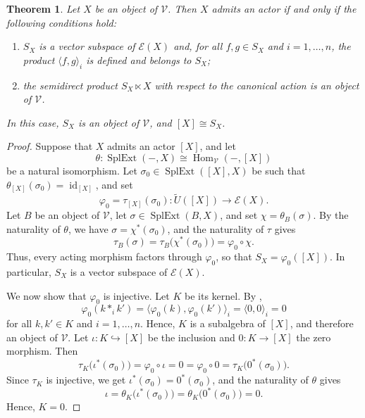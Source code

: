 \documentclass[reqno,a4paper]{amsart}
\theoremstyle{plain}
\newtheorem{theorem}[subsection]{Theorem}
\theoremstyle{definition}
\theoremstyle{remark}
\numberwithin{equation}{section}
\newcommand{\E}{\mathcal{E}}
\newcommand{\V}{\mathcal{V}}
\DeclareMathOperator{\Hom}{Hom}
\DeclareMathOperator{\SplExt}{SplExt}
\DeclareMathOperator{\id}{id}
\begin{document}
\begin{theorem}\label{ThmActorSX}
Let $X$ be an object of $\V$. Then $X$ admits an actor if and only if the following conditions hold:
\begin{enumerate}
\item $S_X$ is a vector subspace of $\E(X)$ and, for all $f,g\in S_X$ and $i=1,\ldots,n$, the product $\langle f,g\rangle_i$ is defined and belongs to $S_X$;
\item the semidirect product $S_X\ltimes X$ with respect to the canonical action is an object of $\V$.
\end{enumerate}
In this case, $S_X$ is an object of $\V$, and $[X]\cong S_X$.
\end{theorem}

\begin{proof}
Suppose that $X$ admits an actor $[X]$, and let
\[
\theta\colon\SplExt(-,X) \cong \Hom_{\V}(-,[X])
\]
be a natural isomorphism. Let $\sigma_0\in\SplExt([X],X)$ be such that $\theta_{[X]}(\sigma_0)=\id_{[X]}$, and set
\[
\varphi_0=\tau_{[X]}(\sigma_0)\colon\widetilde U([X])\to\E(X).
\]
Let $B$ be an object of $\V$, let $\sigma\in\SplExt(B,X)$, and set $\chi=\theta_B(\sigma)$. By the naturality of $\theta$, we have $\sigma=\chi^*(\sigma_0)$, and the naturality of $\tau$ gives
\[
\tau_B(\sigma)=\tau_B\bigl(\chi^*(\sigma_0)\bigr)=\varphi_0\circ\chi.
\]
Thus, every acting morphism factors through $\varphi_0$, so that $S_X=\varphi_0([X])$. In particular, $S_X$ is a vector subspace of $\E(X)$.

We now show that $\varphi_0$ is injective. Let $K$ be its kernel. By ,
\[
\varphi_0(k\ast_ik')=\bigl\langle\varphi_0(k),\varphi_0(k')\bigr\rangle_i=\langle0,0\rangle_i=0
\]
for all $k,k'\in K$ and $i=1,\ldots,n$. Hence, $K$ is a subalgebra of $[X]$, and therefore an object of $\V$. Let $\iota\colon K\hookrightarrow[X]$ be the inclusion and $0\colon K\to[X]$ the zero morphism. Then
\[
\tau_K\bigl(\iota^*(\sigma_0)\bigr)=\varphi_0\circ\iota=0=\varphi_0\circ0=\tau_K\bigl(0^*(\sigma_0)\bigr).
\]
Since $\tau_K$ is injective, we get $\iota^*(\sigma_0)=0^*(\sigma_0)$, and the naturality of $\theta$ gives
\[
\iota=\theta_K\bigl(\iota^*(\sigma_0)\bigr)=\theta_K\bigl(0^*(\sigma_0)\bigr)=0.
\]
Hence, $K=0$.


\end{proof}
\end{document}
